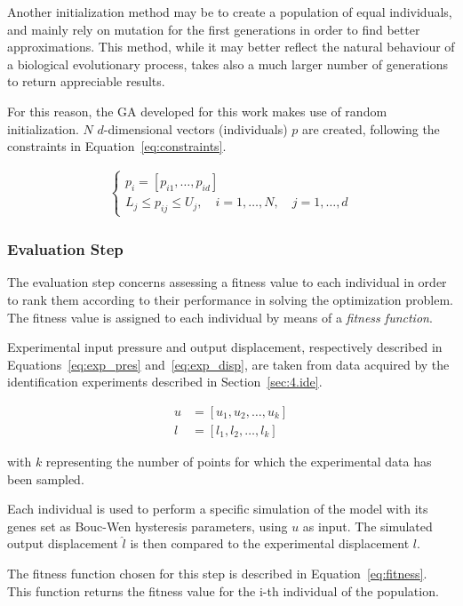 Another initialization method may be to create a population of equal
individuals, and mainly rely on mutation for the first generations
in order to find better approximations. This method, while it may better
reflect the natural behaviour of a biological evolutionary process,
takes also a much larger number of generations to return appreciable results.

For this reason, the GA developed for this work makes use of random initialization.
$N$ $d$-dimensional vectors (individuals) $p$ are created,
following the constraints in Equation~\ref{eq:constraints}.

\begin{align}
\begin{cases}
	p_i = \left[p_{i1},\ldots,p_{id}\right] \\
	L_j \leq p_{ij} \leq U_j, \quad i=1,\ldots,N, \quad j=1,\ldots,d
\end{cases}
\label{eq:constraints}
\end{align}


\subsubsection{Evaluation Step}

The evaluation step concerns assessing a fitness value to each individual
in order to rank them according to their performance in solving the optimization problem.
The fitness value is assigned to each individual by means of a \textit{fitness function}.

Experimental input pressure and output displacement,
respectively described in Equations~\ref{eq:exp_pres} and~\ref{eq:exp_disp},
are taken from data acquired by the identification experiments described
in Section~\ref{sec:4.ide}. 

\begin{align}
u &= \left[u_1,u_2,\ldots,u_k\right] \label{eq:exp_pres} \\
l &= \left[l_1,l_2,\ldots,l_k\right] \label{eq:exp_disp}
\end{align}

with $k$ representing the number of points for which the experimental data
has been sampled.

Each individual is used to perform a specific simulation of the model with its genes
set as Bouc-Wen hysteresis parameters, using $u$ as input.
The simulated output displacement $\hat{l}$
is then compared to the experimental displacement $l$.

The fitness function chosen for this step is described in Equation~\ref{eq:fitness}.
This function returns the fitness value for the i-th individual of the population.

